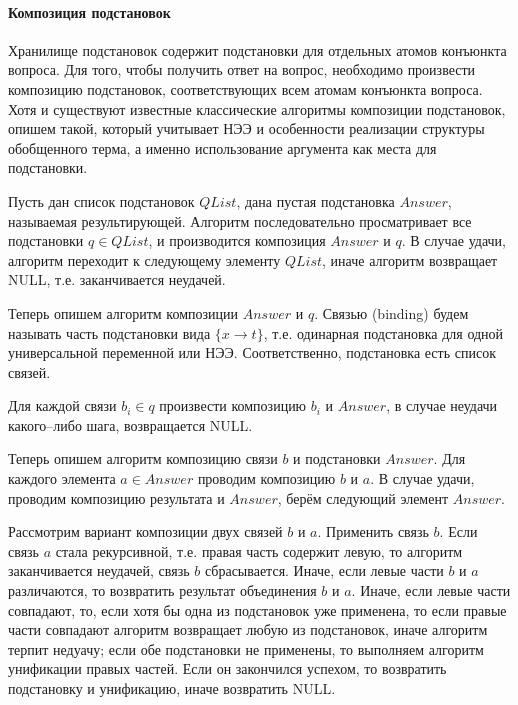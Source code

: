 \paragraph{Композиция подстановок}
Хранилище подстановок содержит подстановки для отдельных атомов конъюнкта вопроса. Для того, чтобы получить ответ на вопрос, необходимо произвести композицию подстановок, соответствующих всем атомам конъюнкта вопроса. Хотя и существуют известные классические алгоритмы композиции подстановок, опишем такой, который учитывает НЭЭ и особенности реализации структуры обобщенного терма, а именно использование аргумента как места для подстановки.

Пусть дан список подстановок $QList$, дана пустая подстановка $Answer$, называемая результирующей. Алгоритм последовательно просматривает все подстановки $q \in QList$, и производится композиция $Answer$ и $q$. В случае удачи, алгоритм переходит к следующему элементу $QList$, иначе алгоритм возвращает NULL, т.е. заканчивается неудачей.

Теперь опишем алгоритм композиции $Answer$ и $q$. Связью (binding) будем называть часть подстановки вида $\{x \rightarrow t\}$, т.е. одинарная подстановка для одной универсальной переменной или НЭЭ. Соответственно, подстановка есть список связей. %

Для каждой связи $b_i \in q$ произвести композицию $b_i$ и $Answer$, в случае неудачи какого--либо шага, возвращается NULL.

Теперь опишем алгоритм композицию связи $b$ и подстановки $Answer$. Для каждого элемента $a \in Answer$ проводим композицию $b$ и $a$. В случае удачи, проводим композицию результата и $Answer$, берём следующий элемент $Answer$.

Рассмотрим вариант композиции двух связей $b$ и $a$. Применить связь $b$. Если связь $a$ стала рекурсивной, т.е. правая часть содержит левую, то алгоритм заканчивается неудачей, связь $b$  сбрасывается. Иначе, если левые части $b$ и $a$ различаются, то возвратить результат объединения $b$ и $a$. Иначе, если левые части совпадают, то, если хотя бы одна из подстановок уже применена, то если правые части совпадают алгоритм возвращает любую из подстановок, иначе алгоритм терпит недуачу; если обе подстановки не применены, то выполняем алгоритм унификации правых частей. Если он закончился успехом, то возвратить подстановку и унификацию, иначе возвратить NULL.


